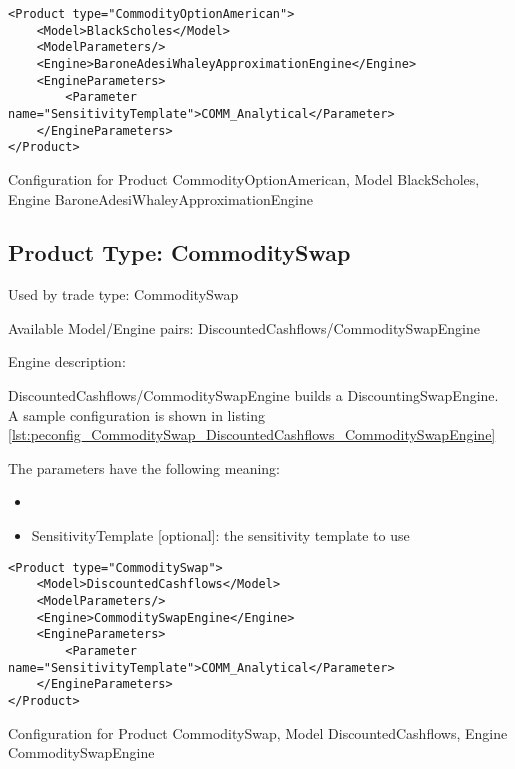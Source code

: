 \begin{longlisting}
\begin{verbatim}
<Product type="CommodityOptionAmerican">
    <Model>BlackScholes</Model>
    <ModelParameters/>
    <Engine>BaroneAdesiWhaleyApproximationEngine</Engine>
    <EngineParameters>
        <Parameter name="SensitivityTemplate">COMM_Analytical</Parameter>
    </EngineParameters>
</Product>
\end{verbatim}
\caption{Configuration for Product CommodityOptionAmerican, Model BlackScholes, Engine BaroneAdesiWhaleyApproximationEngine}
\label{lst:peconfig_CommodityOptionAmerican_BlackScholes_BaroneAdesiWhaleyApproximationEngine}
\end{longlisting}

\subsection{Product Type: CommoditySwap}

Used by trade type: CommoditySwap

Available Model/Engine pairs: DiscountedCashflows/CommoditySwapEngine

Engine description:

DiscountedCashflows/CommoditySwapEngine builds a DiscountingSwapEngine. A sample configuration is shown in listing
\ref{lst:peconfig_CommoditySwap_DiscountedCashflows_CommoditySwapEngine}

The parameters have the following meaning:

\begin{itemize}
\item 
\item SensitivityTemplate [optional]: the sensitivity template to use 
\end{itemize}

\begin{longlisting}
\begin{verbatim}
<Product type="CommoditySwap">
    <Model>DiscountedCashflows</Model>
    <ModelParameters/>
    <Engine>CommoditySwapEngine</Engine>
    <EngineParameters>
        <Parameter name="SensitivityTemplate">COMM_Analytical</Parameter>
    </EngineParameters>
</Product>
\end{verbatim}
\caption{Configuration for Product CommoditySwap, Model DiscountedCashflows, Engine CommoditySwapEngine}
\label{lst:peconfig_CommoditySwap_DiscountedCashflows_CommoditySwapEngine}
\end{longlisting}

